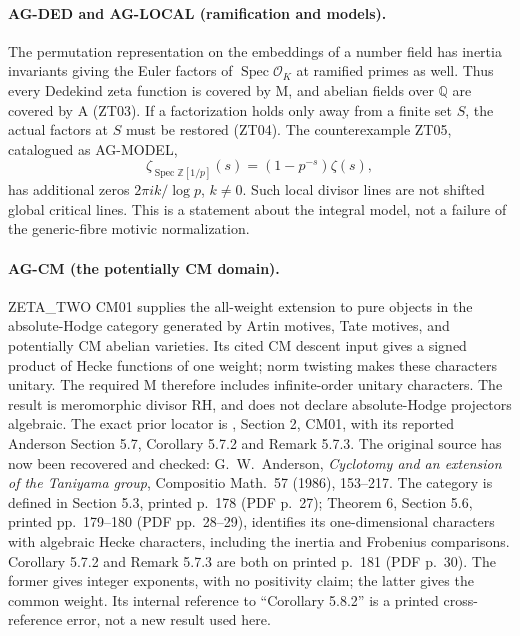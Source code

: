 \documentclass[11pt,a4paper]{article}
\begin{document}
\paragraph{AG-DED and AG-LOCAL (ramification and models).}
The permutation representation on the embeddings of a number field has
inertia invariants giving the Euler factors of $\operatorname{Spec}\mathcal
O_K$ at ramified primes as well. Thus every Dedekind zeta function is covered
by M, and abelian fields over $\mathbb Q$ are covered by A (ZT03).
If a factorization holds only away from a finite set $S$, the actual factors
at $S$ must be restored (ZT04). The counterexample ZT05, catalogued as AG-MODEL,
\[
 \zeta_{\operatorname{Spec}\mathbb Z[1/p]}(s)
       =(1-p^{-s})\zeta(s),
\]
has additional zeros $2\pi i k/\log p$, $k\ne0$. Such local divisor lines
are not shifted global critical lines. This is a statement about the
integral model, not a failure of the generic-fibre motivic normalization.

\paragraph{AG-CM (the potentially CM domain).}
ZETA\_TWO CM01 supplies the all-weight extension to pure objects in the
absolute-Hodge category generated by Artin motives, Tate motives, and
potentially CM abelian varieties. Its cited CM descent input gives a signed
product of Hecke functions of one weight; norm twisting makes these
characters unitary. The required M therefore includes infinite-order
unitary characters. The result is meromorphic divisor RH, and does not
declare absolute-Hodge projectors algebraic. The exact prior locator is
, Section 2, CM01,
with its reported Anderson Section 5.7, Corollary 5.7.2 and Remark 5.7.3.
The original source has now been recovered and checked: G.~W.~Anderson,
\emph{Cyclotomy and an extension of the Taniyama group}, Compositio
Math.~57 (1986), 153--217. The category is defined in Section 5.3,
printed p.~178 (PDF p.~27); Theorem 6, Section 5.6, printed pp.~179--180
(PDF pp.~28--29), identifies its one-dimensional characters with algebraic
Hecke characters, including the inertia and Frobenius comparisons.
Corollary 5.7.2 and Remark 5.7.3 are both on printed p.~181 (PDF p.~30).
The former gives integer exponents, with no positivity claim; the latter
gives the common weight. Its internal reference to ``Corollary 5.8.2'' is
a printed cross-reference error, not a new result used here.
\end{document}
